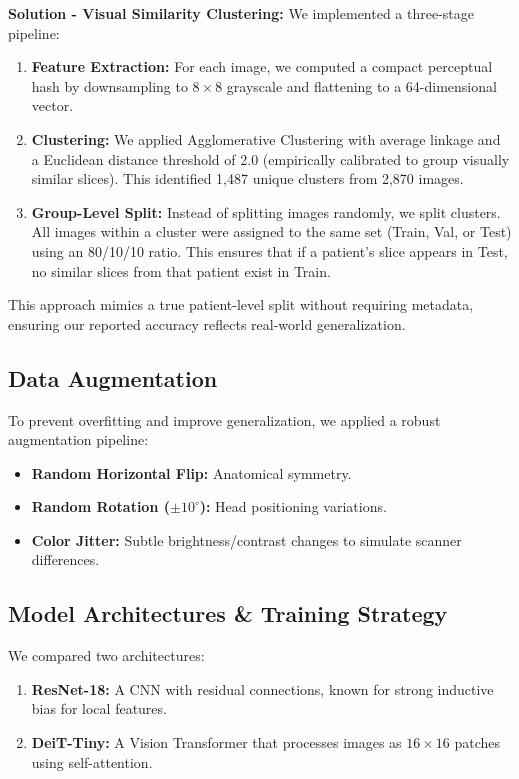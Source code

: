 \documentclass[12pt, a4paper]{article}
\begin{document}
\textbf{Solution - Visual Similarity Clustering:} We implemented a three-stage pipeline:
\begin{enumerate}
    \item \textbf{Feature Extraction:} For each image, we computed a compact perceptual hash by downsampling to $8 \times 8$ grayscale and flattening to a 64-dimensional vector.
    \item \textbf{Clustering:} We applied Agglomerative Clustering with average linkage and a Euclidean distance threshold of 2.0 (empirically calibrated to group visually similar slices). This identified 1,487 unique clusters from 2,870 images.
    \item \textbf{Group-Level Split:} Instead of splitting images randomly, we split clusters. All images within a cluster were assigned to the same set (Train, Val, or Test) using an 80/10/10 ratio. This ensures that if a patient's slice appears in Test, no similar slices from that patient exist in Train.
\end{enumerate}

This approach mimics a true patient-level split without requiring metadata, ensuring our reported accuracy reflects real-world generalization.

\subsection{Data Augmentation}
To prevent overfitting and improve generalization, we applied a robust augmentation pipeline:
\begin{itemize}
    \item \textbf{Random Horizontal Flip:} Anatomical symmetry.
    \item \textbf{Random Rotation ($\pm 10^\circ$):} Head positioning variations.
    \item \textbf{Color Jitter:} Subtle brightness/contrast changes to simulate scanner differences.
\end{itemize}

\subsection{Model Architectures & Training Strategy}
We compared two architectures:
\begin{enumerate}
    \item \textbf{ResNet-18:} A CNN with residual connections, known for strong inductive bias for local features.
    \item \textbf{DeiT-Tiny:} A Vision Transformer that processes images as $16 \times 16$ patches using self-attention.
\end{enumerate}
\end{document}
